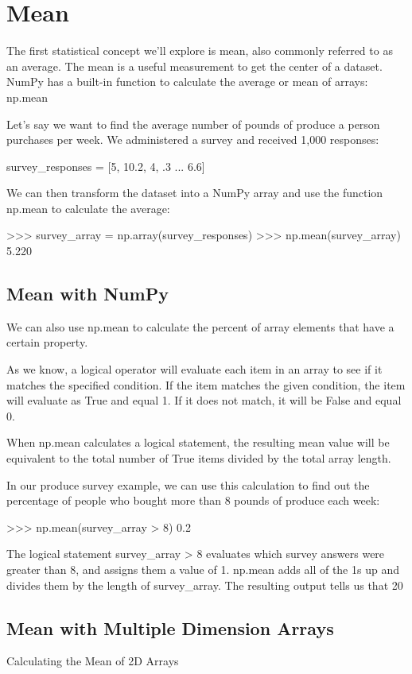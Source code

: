 \documentclass{journal}
\begin{document}
\section{Mean}

The first statistical concept we'll explore is mean, also commonly referred to as an average. The mean is a useful measurement to get the center of a dataset. NumPy has a built-in function to calculate the average or mean of arrays: np.mean

Let's say we want to find the average number of pounds of produce a person purchases per week. We administered a survey and received 1,000 responses:

survey_responses = [5, 10.2, 4, .3 ... 6.6]

We can then transform the dataset into a NumPy array and use the function np.mean to calculate the average:

>>> survey_array = np.array(survey_responses)
>>> np.mean(survey_array)
5.220

\subsection{Mean with NumPy}
We can also use np.mean to calculate the percent of array elements that have a certain property.

As we know, a logical operator will evaluate each item in an array to see if it matches the specified condition. If the item matches the given condition, the item will evaluate as True and equal 1. If it does not match, it will be False and equal 0.

When np.mean calculates a logical statement, the resulting mean value will be equivalent to the total number of True items divided by the total array length.

In our produce survey example, we can use this calculation to find out the percentage of people who bought more than 8 pounds of produce each week:

>>> np.mean(survey_array > 8)
0.2

The logical statement survey_array > 8 evaluates which survey answers were greater than 8, and assigns them a value of 1. np.mean adds all of the 1s up and divides them by the length of survey_array. The resulting output tells us that 20%

\subsection{Mean with Multiple Dimension Arrays}
Calculating the Mean of 2D Arrays
\end{document}
